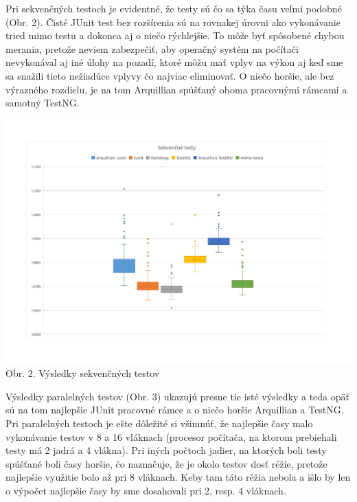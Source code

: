 \documentclass[11pt,twoside,slovak,a4paper]{article}
\begin{document}
	Pri sekvenčných testoch je evidentné, že testy sú čo sa týka času veľmi podobné (Obr. 2). Čisté JUnit test bez rozšírenia sú na rovnakej úrovni ako vykonávanie tried mimo testu a dokonca aj o niečo rýchlejšie. To môže byť spôsobené chybou merania, pretože neviem zabezpečiť, aby operačný systém na počítači nevykonával aj iné úlohy na pozadí, ktoré môžu mať vplyv na výkon aj keď sme sa snažili tieto nežiadúce vplyvy čo najviac eliminovať. O niečo horšie, ale bez výrazného rozdielu, je na tom Arquillian spúšťaný oboma pracovnými rámcami a samotný TestNG.
	
	\begin{center}
		\includegraphics[width = 400pt]{graf_sekvencne}
		\newline
		\tiny Obr. 2. Výsledky sekvenčných testov
	\end{center}
	
	Výsledky paralelných testov (Obr. 3) ukazujú presne tie isté výsledky a teda opäť sú na tom najlepšie JUnit pracovné rámce a o niečo horšie Arquillian a TestNG. Pri paralelných testoch je ešte dôležité si všimnúť, že najlepšie časy malo vykonávanie testov v 8 a 16 vláknach (procesor počítača, na ktorom prebiehali testy má 2 jadrá a 4 vlákna). Pri iných počtoch jadier, na ktorých boli testy spúšťané boli časy horšie, čo naznačuje, že je okolo testov dosť réžie, pretože najlepšie využitie bolo až pri 8 vláknach. Keby tam táto réžia nebola a išlo by len o výpočet najlepšie časy by sme dosahovali pri 2, resp. 4 vláknach.
	
\end{document}
